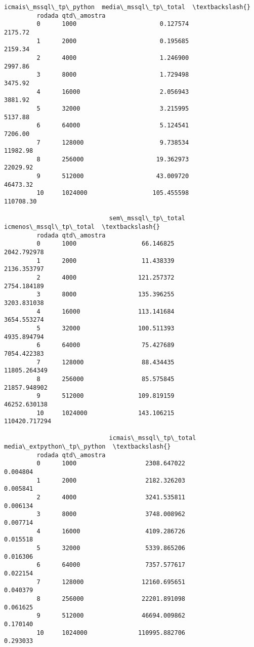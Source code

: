 \documentclass[11pt]{article}
\begin{document}
\begin{Verbatim}[commandchars=\\\{\}]
                             icmais\_mssql\_tp\_python  media\_mssql\_tp\_total  \textbackslash{}
         rodada qtd\_amostra                                                 
         0      1000                       0.127574               2175.72   
         1      2000                       0.195685               2159.34   
         2      4000                       1.246900               2997.86   
         3      8000                       1.729498               3475.92   
         4      16000                      2.056943               3881.92   
         5      32000                      3.215995               5137.88   
         6      64000                      5.124541               7206.00   
         7      128000                     9.738534              11982.98   
         8      256000                    19.362973              22029.92   
         9      512000                    43.009720              46473.32   
         10     1024000                  105.455598             110708.30   
         
                             sem\_mssql\_tp\_total  icmenos\_mssql\_tp\_total  \textbackslash{}
         rodada qtd\_amostra                                               
         0      1000                  66.146825             2042.792978   
         1      2000                  11.438339             2136.353797   
         2      4000                 121.257372             2754.184189   
         3      8000                 135.396255             3203.831038   
         4      16000                113.141684             3654.553274   
         5      32000                100.511393             4935.894794   
         6      64000                 75.427689             7054.422383   
         7      128000                88.434435            11805.264349   
         8      256000                85.575845            21857.948902   
         9      512000               109.819159            46252.630138   
         10     1024000              143.106215           110420.717294   
         
                             icmais\_mssql\_tp\_total  media\_extpython\_tp\_python  \textbackslash{}
         rodada qtd\_amostra                                                     
         0      1000                   2308.647022                   0.004804   
         1      2000                   2182.326203                   0.005841   
         2      4000                   3241.535811                   0.006134   
         3      8000                   3748.008962                   0.007714   
         4      16000                  4109.286726                   0.015518   
         5      32000                  5339.865206                   0.016306   
         6      64000                  7357.577617                   0.022154   
         7      128000                12160.695651                   0.040379   
         8      256000                22201.891098                   0.061625   
         9      512000                46694.009862                   0.170140   
         10     1024000              110995.882706                   0.293033   
         

\end{Verbatim}
\end{document}
